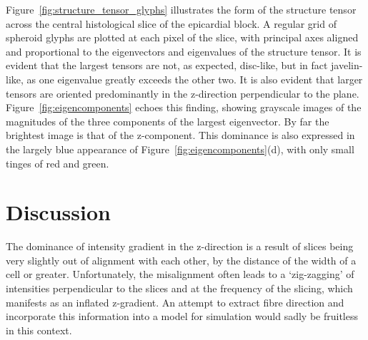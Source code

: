   Figure~\ref{fig:structure_tensor_glyphs} illustrates the form of the structure tensor across the central histological slice of the epicardial block. A regular grid of spheroid glyphs are plotted at each pixel of the slice, with principal axes aligned and proportional to the eigenvectors and eigenvalues of the structure tensor. It is evident that the largest tensors are not, as expected, disc-like, but in fact javelin-like, as one eigenvalue greatly exceeds the other two. It is also evident that larger tensors are oriented predominantly in the z-direction perpendicular to the plane. Figure~\ref{fig:eigencomponents} echoes this finding, showing grayscale images of the magnitudes of the three components of the largest eigenvector. By far the brightest image is that of the z-component. This dominance is also expressed in the largely blue appearance of Figure~\ref{fig:eigencomponents}(d), with only small tinges of red and green.

\section{Discussion} %
  The dominance of intensity gradient in the z-direction is a result of slices being very slightly out of alignment with each other, by the distance of the width of a cell or greater. Unfortunately, the misalignment often leads to a `zig-zagging' of intensities perpendicular to the slices and at the frequency of the slicing, which manifests as an inflated z-gradient. An attempt to extract fibre direction and incorporate this information into a model for simulation would sadly be fruitless in this context.
  
\label{sec:discussion}
  

